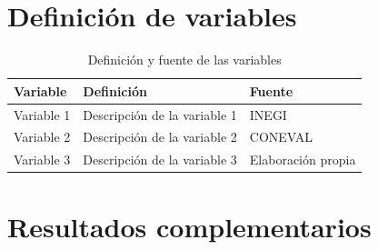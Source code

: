 \appendix

\chapter{Definición de variables}\label{anx:variables}

\begin{table}[htbp]
  \centering
  \caption{Definición y fuente de las variables}
  \label{tab:variables}
  \begin{tabular}{lp{8cm}l}
    \toprule
    Variable & Definición & Fuente \\
    \midrule
    Variable 1 & Descripción de la variable 1 & INEGI \\
    Variable 2 & Descripción de la variable 2 & CONEVAL \\
    Variable 3 & Descripción de la variable 3 & Elaboración propia \\
    \bottomrule
  \end{tabular}
\end{table}

\chapter{Resultados complementarios}\label{anx:complementarios}

\lipsum[20]
